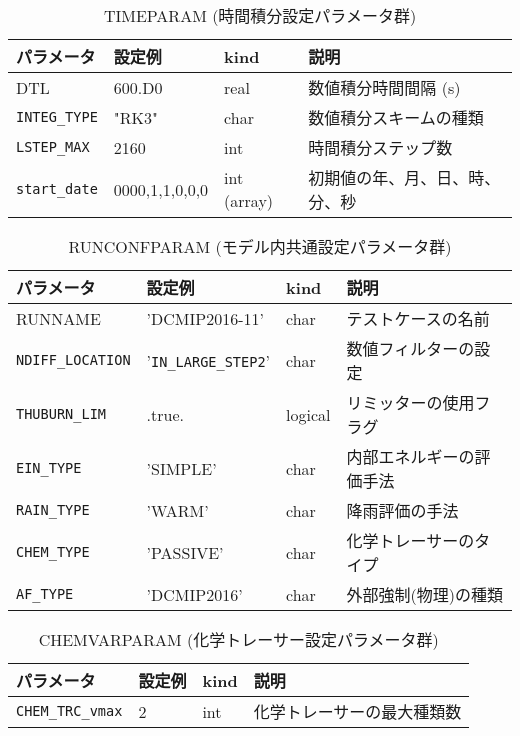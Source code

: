 \begin{table}[htb]
\begin{center}
\caption{TIMEPARAM (時間積分設定パラメータ群)}
\begin{tabularx}{150mm}{|l|l|l|X|} \hline
 \rowcolor[gray]{0.9} パラメータ & 設定例 & kind & 説明          \\ \hline
 DTL        & 600.D0 & real & 数値積分時間間隔 (s) \\ \hline
 \verb|INTEG_TYPE| & "RK3"  & char & 数値積分スキームの種類 \\ \hline
 \verb|LSTEP_MAX|  & 2160   & int  &  時間積分ステップ数 \\ \hline
 \verb|start_date| & 0000,1,1,0,0,0 & int (array) & 初期値の年、月、日、時、分、秒 \\ \hline
\end{tabularx}
\end{center}
\end{table}

\begin{table}[htb]
\begin{center}
\caption{RUNCONFPARAM (モデル内共通設定パラメータ群)}
\begin{tabularx}{150mm}{|l|l|l|X|} \hline
 \rowcolor[gray]{0.9} パラメータ & 設定例 & kind & 説明          \\ \hline
 RUNNAME               & 'DCMIP2016-11'   & char & テストケースの名前 \\ \hline
 \verb|NDIFF_LOCATION|        & '\verb|IN_LARGE_STEP2|' & char  & 数値フィルターの設定 \\ \hline
 \verb|THUBURN_LIM|           & .true.      & logical & リミッターの使用フラグ \\ \hline
 \verb|EIN_TYPE|              & 'SIMPLE'    & char  & 内部エネルギーの評価手法 \\ \hline
 \verb|RAIN_TYPE|             & 'WARM'      & char & 降雨評価の手法 \\ \hline
 \verb|CHEM_TYPE|             & 'PASSIVE'   & char & 化学トレーサーのタイプ \\ \hline
 \verb|AF_TYPE|               & 'DCMIP2016' & char & 外部強制(物理)の種類 \\ \hline
\end{tabularx}
\end{center}
\end{table}

\begin{table}[htb]
\begin{center}
\caption{CHEMVARPARAM (化学トレーサー設定パラメータ群)}
\begin{tabularx}{150mm}{|l|l|l|X|} \hline
 \rowcolor[gray]{0.9} パラメータ & 設定例 & kind & 説明          \\ \hline
 \verb|CHEM_TRC_vmax| & 2 & int &  化学トレーサーの最大種類数 \\ \hline
\end{tabularx}
\end{center}
\end{table}

